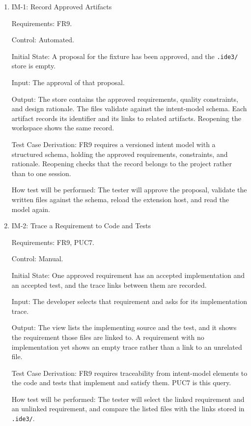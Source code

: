 \documentclass[12pt, titlepage]{article}
\begin{document}
\begin{enumerate}

\item{IM-1: Record Approved Artifacts\\}

Requirements: FR9.

Control: Automated.

Initial State: A proposal for the fixture has been approved, and the
\texttt{.ide3/} store is empty.

Input: The approval of that proposal.

Output: The store contains the approved requirements, quality constraints,
and design rationale. The files validate against the intent-model schema.
Each artifact records its identifier and its links to related artifacts.
Reopening the workspace shows the same record.

Test Case Derivation: FR9 requires a versioned intent model with a
structured schema, holding the approved requirements, constraints, and
rationale. Reopening checks that the record belongs to the project rather
than to one session.

How test will be performed: The tester will approve the proposal, validate
the written files against the schema, reload the extension host, and read
the model again.

\item{IM-2: Trace a Requirement to Code and Tests\\}

Requirements: FR9, PUC7.

Control: Manual.

Initial State: One approved requirement has an accepted implementation and
an accepted test, and the trace links between them are recorded.

Input: The developer selects that requirement and asks for its
implementation trace.

Output: The view lists the implementing source and the test, and it shows
the requirement those files are linked to. A requirement with no
implementation yet shows an empty trace rather than a link to an unrelated
file.

Test Case Derivation: FR9 requires traceability from intent-model elements
to the code and tests that implement and satisfy them. PUC7 is this query.

How test will be performed: The tester will select the linked requirement
and an unlinked requirement, and compare the listed files with the links
stored in \texttt{.ide3/}.


\end{enumerate}
\end{document}
